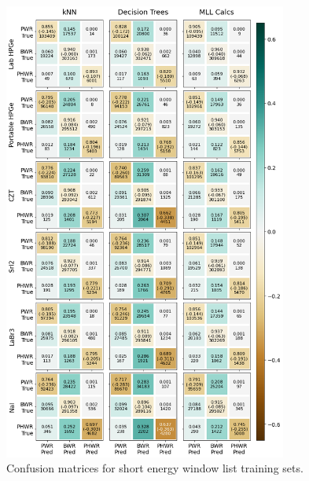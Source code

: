 \begin{figure}[!htbp]
  \centering
  \includegraphics[width=0.83\textwidth]{./chapters/exp2/confusion_matrix_6dets_short.png}
  \caption[Confusion matrices for short energy window list training sets.]
          {Confusion matrices for short energy window list training sets.}
  \label{fig:cm_short}
\end{figure}

